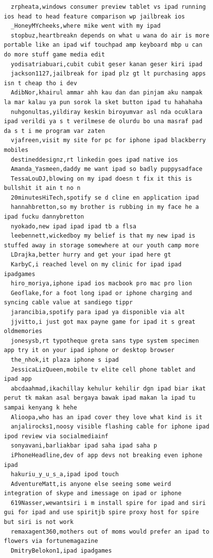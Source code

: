 \begin{figure}[htpb]
\begin{verbatim}
  zrpheata,windows consumer preview tablet vs ipad running ios head to head feature comparison wp jailbreak ios
  _HoneyMYcheeks,where mike went with my ipad
  stopbuz,heartbreakn depends on what u wana do air is more portable like an ipad wif touchpad amp keyboard mbp u can do more stuff game media edit
  yodisatriabuari,cubit cubit geser kanan geser kiri ipad
  jackson1127,jailbreak for ipad plz gt lt purchasing apps isn t cheap tho i dev
  AdibNor,khairul ammar ahh kau dan dan pinjam aku nampak la mar kalau ya pun sorok la sket button ipad tu hahahaha
  nuhgonultas,yildiray keskin biroyumvar asl nda ocuklara ipad verildi ya s t verilmese de olurdu bo una masraf pad da s t i me program var zaten
  vjafreen,visit my site for pc for iphone ipad blackberry mobiles
  destineddesignz,rt linkedin goes ipad native ios
  Amanda_Yasmeen,daddy me want ipad so badly puppysadface
  TessaLouDJ,blowing on my ipad doesn t fix it this is bullshit it ain t no n
  20minutesHiTech,spotify se d cline en application ipad
  hannahbretton,so my brother is rubbing in my face he a ipad fucku dannybretton
  nyokado,new ipad ipad ipad tb a flsa
  leebennett,wickedboy my belief is that my new ipad is stuffed away in storage somewhere at our youth camp more
  LDrajka,better hurry and get your ipad here gt
  KarbyC,i reached level on my clinic for ipad ipad ipadgames
  hiro_moriya,iphone ipad ios macbook pro mac pro lion
  Geoflake,for a foot long ipad or iphone charging and syncing cable value at sandiego tippr
  jarancibia,spotify para ipad ya disponible via alt
  jjvitto,i just got max payne game for ipad it s great oldmemories
  jonesysb,rt typotheque greta sans type system specimen app try it on your ipad iphone or desktop browser
  the_nhok,it plaza iphone s ipad
  JessicaLizQueen,mobile tv elite cell phone tablet and ipad app
  abcdaahmad,ikachillay kehulur kehilir dgn ipad biar ikat perut tk makan asal bergaya bawak ipad makan la ipad tu sampai kenyang k hehe
  Alioopa,who has an ipad cover they love what kind is it
  anjalirocks1,noosy visible flashing cable for iphone ipad ipod review via socialmediainf
  sonyavani,barliakbar ipad saha ipad saha p
  iPhoneHeadline,dev of app devs not breaking even iphone ipad
  hakuriu_y_u_s_a,ipad ipod touch
  AdventureMatt,is anyone else seeing some weird integration of skype and imessage on ipad or iphone
  619Nasser,wewantsiri i m install spire for ipad and siri gui for ipad and use spiritjb spire proxy host for spire but siri is not work
  remaxagent360,mothers out of moms would prefer an ipad to flowers via fortunemagazine
  DmitryBelokon1,ipad ipadgames

\end{verbatim}
\end{figure}
